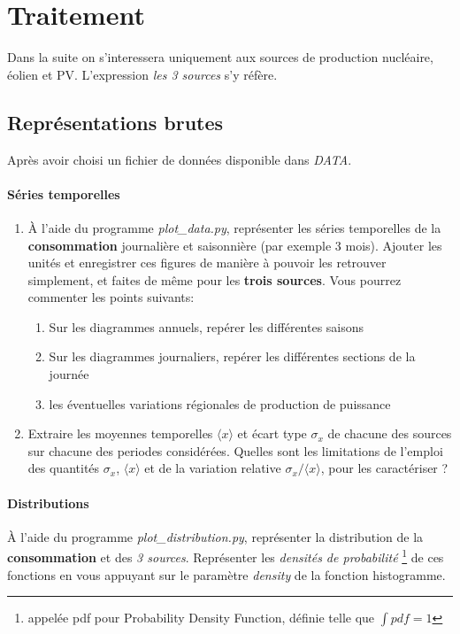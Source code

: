 \documentclass[12pt,a4,french]{article}
\newcommand{\tmtextbf}[1]{{\bfseries{#1}}}
\newcommand{\tmtextit}[1]{{\itshape{#1}}}
\begin{document}
\section{Traitement}

Dans la suite on s'interessera uniquement aux sources de production
nucléaire, éolien et PV. L'expression \tmtextit{les 3 sources} s'y
réfère.


\subsection{Représentations brutes}
Après avoir choisi un fichier de données disponible dans \textit{DATA}.
\paragraph{Séries temporelles}
\begin{enumerate}
  \item À l'aide du programme \tmtextit{plot\_data.py}, représenter les séries temporelles de la \tmtextbf{consommation} journalière et saisonnière (par exemple 3 mois). Ajouter les unités et enregistrer ces figures de manière à pouvoir les retrouver simplement, et faites de même pour les \textbf{trois sources}. Vous pourrez commenter les points suivants:
  \begin{enumerate}
    \item Sur les diagrammes annuels, repérer les différentes saisons
    
    \item Sur les diagrammes journaliers, repérer les différentes sections de la journée
    
    \item les éventuelles variations régionales de production de puissance
  \end{enumerate}
  \item Extraire les moyennes temporelles $\langle x \rangle$ et écart type
  $\sigma_x$ de chacune des sources sur chacune des periodes considérées.
  Quelles sont les limitations de l'emploi des quantités $\sigma_x $, $ \langle
  x \rangle$ et de la variation relative $\sigma_x / \langle
  x \rangle$, pour les caractériser ?
\end{enumerate}

\paragraph{Distributions} À l'aide du programme \tmtextit{plot\_distribution.py}, représenter la distribution de la \tmtextbf{consommation} et des \textit{3 sources}. Représenter les \tmtextit{densités de probabilité} \footnote{appelée pdf pour Probability Density Function, définie telle que $\int pdf = 1$} de ces fonctions en vous appuyant sur le paramètre \tmtextit{density} de la fonction histogramme. 
\end{document}
